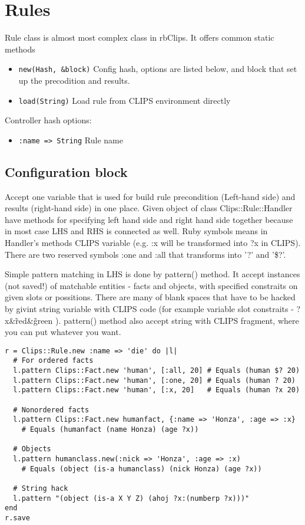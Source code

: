 \documentclass[a4paper,10pt]{article}
\begin{document}
\section{Rules}
Rule class is almost most complex class in rbClips. It offers common static methods
\begin{itemize}
 \item \texttt{new(Hash, \&block)} Config hash, options are listed below, and  block that set up the precodition and results.
 \item \texttt{load(String)} Load rule from CLIPS environment directly
\end{itemize}

Controller hash options:
\begin{itemize}
 \item \texttt{:name => String} Rule name
\end{itemize}

\subsection{Configuration block}
Accept one variable that is used for build rule precondition (Left-hand side) and results (right-hand side) in one place. Given object of class Clips::Rule::Handler have methods for specifying left hand side and right hand side together because in most case LHS and RHS is connected as well. Ruby symbols means in Handler's methods CLIPS variable (e.g. :x will be transformed into ?x in CLIPS). There are two reserved symbols :one and :all that transforms into '?' and '\$?'.

Simple pattern matching in LHS is done by pattern() method. It accept instances (not saved!) of matchable entities - facts and objects, with specified constraits on given slots or possitions. There are many of blank spaces that have to be hacked by givint string variable with CLIPS code (for example variable slot constraits - ?x\&\~red\&\~green ). pattern() method also accept string with CLIPS fragment, where you can put whatever you want. 

\begin{verbatim}
r = Clips::Rule.new :name => 'die' do |l|
  # For ordered facts
  l.pattern Clips::Fact.new 'human', [:all, 20] # Equals (human $? 20)
  l.pattern Clips::Fact.new 'human', [:one, 20] # Equals (human ? 20)
  l.pattern Clips::Fact.new 'human', [:x, 20]   # Equals (human ?x 20)
  
  # Nonordered facts
  l.pattern Clips::Fact.new humanfact, {:name => 'Honza', :age => :x} 
    # Equals (humanfact (name Honza) (age ?x))

  # Objects
  l.pattern humanclass.new(:nick => 'Honza', :age => :x)
    # Equals (object (is-a humanclass) (nick Honza) (age ?x))
	
  # String hack
  l.pattern "(object (is-a X Y Z) (ahoj ?x:(numberp ?x)))"
end
r.save
\end{verbatim}
\end{document}

